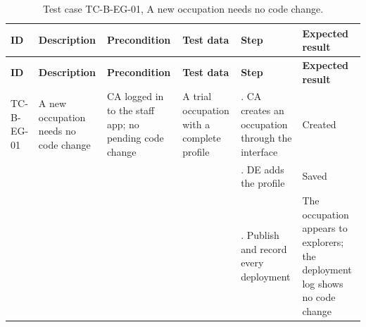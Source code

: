 {\footnotesize{}\renewcommand{\arraystretch}{1.1}
\begin{longtable}{|>{\raggedright\arraybackslash}p{}|>{\raggedright\arraybackslash}p{}|>{\raggedright\arraybackslash}p{}|>{\raggedright\arraybackslash}p{}|>{\raggedright\arraybackslash}p{}|>{\raggedright\arraybackslash}p{}|}
\caption{Test case TC-B-EG-01, A new occupation needs no code change.} \\
\hline
\textbf{ID} & \textbf{Description} & \textbf{Precondition} & \textbf{Test data} & \textbf{Step} & \textbf{Expected result} \\ \hline
\endfirsthead
\hline
\textbf{ID} & \textbf{Description} & \textbf{Precondition} & \textbf{Test data} & \textbf{Step} & \textbf{Expected result} \\ \hline
\endhead
TC-B-EG-01 & A new occupation needs no code change & CA logged in to the staff app; no pending code change & A trial occupation with a complete profile & 1. CA creates an occupation through the interface & Created \\ \cline{5-6}
 &  &  &  & 2. DE adds the profile & Saved \\ \cline{5-6}
 &  &  &  & 3. Publish and record every deployment & The occupation appears to explorers; the deployment log shows no code change \\ \hline
\end{longtable}
}

